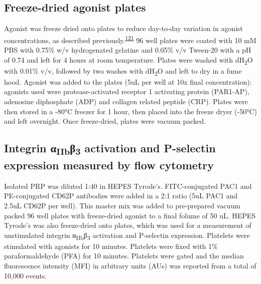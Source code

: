\documentclass[11pt,twoside]{bristolthesis}
\begin{document}
\hypertarget{freeze-dried-agonist-plates}{%
\subsection{Freeze-dried agonist plates}\label{freeze-dried-agonist-plates}}

Agonist was freeze dried onto plates to reduce day-to-day variation in agonist concentrations, as described previously.\textsuperscript{\protect\hyperlink{ref-Chan2018}{121}} 96 well plates were coated with 10 mM PBS with 0.75\% w/v hydrogenated gelatine and 0.05\% v/v Tween-20 with a pH of 0.74 and left for 4 hours at room temperature. Plates were washed with dH\textsubscript{2}O with 0.01\% v/v, followed by two washes with dH\textsubscript{2}O and left to dry in a fume hood. Agonist was added to the plates (5uL per well at 10x final concentration): agonists used were protease-activated receptor 1 activating protein (PAR1-AP), adenosine diphosphate (ADP) and collagen related peptide (CRP). Plates were then stored in a -80°C freezer for 1 hour, then placed into the freeze dryer (-50°C) and left overnight. Once freeze-dried, plates were vacuum packed.

\hypertarget{integrin-ux3b1iibux3b23-activation-and-p-selectin-expression-measured-by-flow-cytometry}{%
\subsection{\texorpdfstring{Integrin α\textsubscript{IIb}β\textsubscript{3} activation and P-selectin expression measured by flow cytometry}{Integrin αIIbβ3 activation and P-selectin expression measured by flow cytometry}}\label{integrin-ux3b1iibux3b23-activation-and-p-selectin-expression-measured-by-flow-cytometry}}

Isolated PRP was diluted 1:40 in HEPES Tyrode's. FITC-conjugated PAC1 and PE-conjugated CD62P antibodies were added in a 2:1 ratio (5uL PAC1 and 2.5uL CD62P per well). This master mix was added to pre-prepared vacuum packed 96 well plates with freeze-dried agonist to a final folume of 50 uL. HEPES Tyrode's was also freeze-dried onto plates, which was used for a measurement of unstimulated integrin α\textsubscript{IIb}β\textsubscript{3} activation and P-selectin expression. Platelets were stimulated with agonists for 10 minutes. Platelets were fixed with 1\% paraformaldehyde (PFA) for 10 minutes. Platelets were gated and the median fluorescence intensity (MFI) in arbitrary units (AUs) was reported from a total of 10,000 events.
\end{document}
